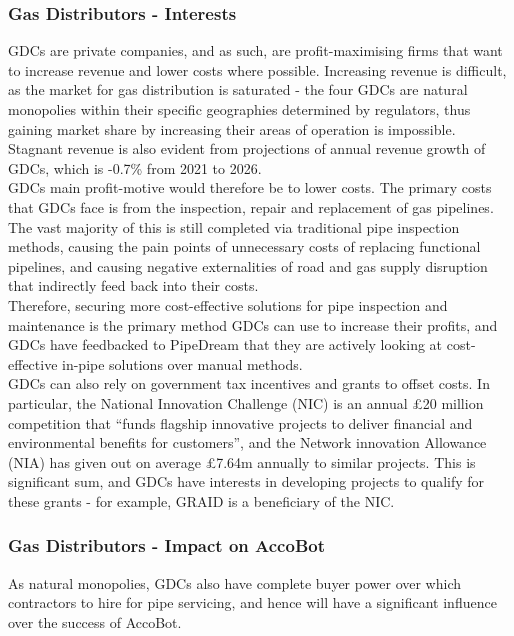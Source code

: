 \documentclass[11pt]{article}		%
\begin{document}
	    \subsubsection{Gas Distributors - Interests}
	    GDCs are private companies, and as such, are profit-maximising firms that want to increase revenue and lower costs where possible. Increasing revenue is difficult, as the market for gas distribution is saturated - the four GDCs are natural monopolies within their specific geographies determined by regulators, thus gaining market share by increasing their areas of operation is impossible. Stagnant revenue is also evident from projections of annual revenue growth of GDCs, which is -0.7\% from 2021 to 2026.
        \\ \hspace*{3ex}GDCs main profit-motive would therefore be to lower costs. The primary costs that GDCs face is from the inspection, repair and replacement of gas pipelines. The vast majority of this is still completed via traditional pipe inspection methods, causing the pain points of unnecessary costs of replacing functional pipelines, and causing negative externalities of road and gas supply disruption that indirectly feed back into their costs. 
        \\ \hspace*{3ex}Therefore, securing more cost-effective solutions for pipe inspection and maintenance is the primary method GDCs can use to increase their profits, and GDCs have feedbacked to PipeDream that they are actively looking at cost-effective in-pipe solutions over manual methods. 
        \\ \hspace*{3ex}GDCs can also rely on government tax incentives and grants to offset costs. In particular, the National Innovation Challenge (NIC) is an annual £20 million competition that “funds flagship innovative projects to deliver financial and environmental benefits for customers”, and the Network innovation Allowance (NIA) has given out on average £7.64m annually to similar projects. This is significant sum, and GDCs have interests in developing projects to qualify for these grants - for example, GRAID is a beneficiary of the NIC.  
        
        \subsubsection{Gas Distributors - Impact on AccoBot}
        As natural monopolies, GDCs also have complete buyer power over which contractors to hire for pipe servicing, and hence will have a significant influence over the success of AccoBot. 
        
\end{document}
